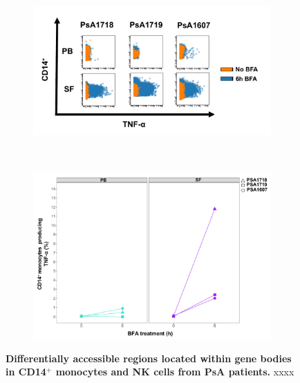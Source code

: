 \bigskip
\begin{figure}[H]
\centering
\begin{subfigure}[b]{0.80\textwidth}
\centering 
\includegraphics[width=\textwidth]{./Results3/pdfs/PSA_0h_6h_BFA_TNFa_mass_cytometry_PSA1718_PSA1719_PSA1607}
\caption{}
\end{subfigure}
~
\begin{subfigure}[b]{0.65\textwidth} 
\centering
\includegraphics[width=\textwidth]{./Results3/pdfs/PSA_percent_monocytes_producing_TNFa_PB_and_SF}
\caption{}
\end{subfigure}
\caption[Mass cytometry analysis of TNF-$\alpha$ production in SF and PB by CD14$^+$ monocytes after protein transport blockade with BFA.]{\textbf{Differentially accessible regions located within gene bodies in CD14$^+$ monocytes and NK cells from PsA patients.} xxxx}
\label{figure:PsA_monocytes_percentage_TNFa}
\end{figure}


